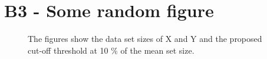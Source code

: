 \newpage
\vspace*{0.5cm}
\section*{\large{B3 - Some random figure}}
\vspace*{1cm}

\begin{figure}[H]
  \centering
  \hfill
  \caption[Data set sizes]{The figures show the data set sizes of X and Y and the proposed cut-off threshold at 10 $\%$ of the mean set size.}
\end{figure}



